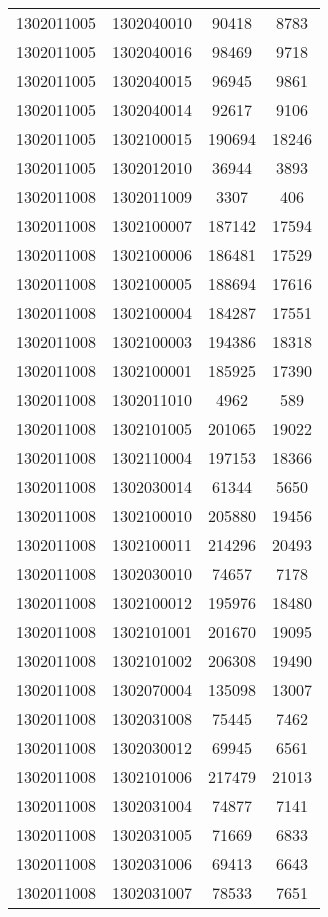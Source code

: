 \begin{longtable}[h]{llcc}
		1302011005 & 1302040010 & 90418 & 8783\\
		1302011005 & 1302040016 & 98469 & 9718\\
		1302011005 & 1302040015 & 96945 & 9861\\
		1302011005 & 1302040014 & 92617 & 9106\\
		1302011005 & 1302100015 & 190694 & 18246\\
		1302011005 & 1302012010 & 36944 & 3893\\
		1302011008 & 1302011009 & 3307 & 406\\
		1302011008 & 1302100007 & 187142 & 17594\\
		1302011008 & 1302100006 & 186481 & 17529\\
		1302011008 & 1302100005 & 188694 & 17616\\
		1302011008 & 1302100004 & 184287 & 17551\\
		1302011008 & 1302100003 & 194386 & 18318\\
		1302011008 & 1302100001 & 185925 & 17390\\
		1302011008 & 1302011010 & 4962 & 589\\
		1302011008 & 1302101005 & 201065 & 19022\\
		1302011008 & 1302110004 & 197153 & 18366\\
		1302011008 & 1302030014 & 61344 & 5650\\
		1302011008 & 1302100010 & 205880 & 19456\\
		1302011008 & 1302100011 & 214296 & 20493\\
		1302011008 & 1302030010 & 74657 & 7178\\
		1302011008 & 1302100012 & 195976 & 18480\\
		1302011008 & 1302101001 & 201670 & 19095\\
		1302011008 & 1302101002 & 206308 & 19490\\
		1302011008 & 1302070004 & 135098 & 13007\\
		1302011008 & 1302031008 & 75445 & 7462\\
		1302011008 & 1302030012 & 69945 & 6561\\
		1302011008 & 1302101006 & 217479 & 21013\\
		1302011008 & 1302031004 & 74877 & 7141\\
		1302011008 & 1302031005 & 71669 & 6833\\
		1302011008 & 1302031006 & 69413 & 6643\\
		1302011008 & 1302031007 & 78533 & 7651\\

\end{longtable}
